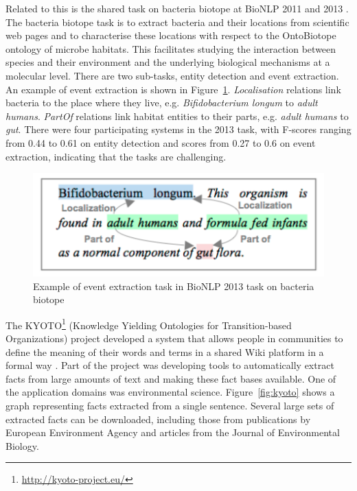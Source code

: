 Related to this is the shared task on bacteria biotope at BioNLP 2011 and 2013 \citep{bossy2013bionlp}.
The bacteria biotope task is to extract bacteria and their locations from scientific web pages and to characterise these locations with respect to the OntoBiotope ontology of microbe habitats.
This facilitates studying the interaction between species and their environment and  the underlying biological mechanisms at a molecular level.
There are two sub-tasks, entity detection and event extraction.
An example of event extraction is shown in Figure~\ref{fig:biotope}.
\emph{Localisation} relations link bacteria to the place where they live, e.g. \emph{Bifidobacterium longum} to \emph{adult humans}.
\emph{PartOf} relations link habitat entities to their parts, e.g. \emph{adult humans} to \emph{gut}.
There were four participating systems in the 2013 task, with F-scores ranging from 0.44 to 0.61 on entity detection and scores from 0.27 to 0.6 on event extraction, indicating that the tasks are challenging. 

\begin{figure}
\begin{center}
\includegraphics[scale=0.6]{figures/biotope.pdf}
 \caption{Example of event extraction task in BioNLP 2013 task on bacteria biotope \citep{bossy2013bionlp}}
\label{fig:biotope}
\end{center}
\end{figure} 

The KYOTO\footnote{\url{http://kyoto-project.eu/}} (Knowledge Yielding Ontologies for Transition-based Organizations) project developed a system that allows people in communities to define the meaning of their words and terms in a shared Wiki platform in a formal way \citep{Vossen2008}.
Part of the project was developing tools to automatically extract facts from large amounts of text and making these fact bases available.
One of the application domains was environmental science.
Figure~\ref{fig:kyoto} shows a graph representing facts extracted from a single sentence.
Several large sets of extracted facts can be downloaded, including those from publications by European Environment Agency and articles from the Journal of Environmental Biology.  

